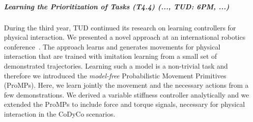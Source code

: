 

\subparagraph{Learning the Prioritization of Tasks (T4.4) (..., TUD: 6PM, ...)}%

During the third year, TUD continued its research on learning controllers for 
physical interaction. We presented a novel approach at an international robotics 
conference~\cite{paraschos2015model}. The approach learns and generates 
movements for physical interaction that are trained with imitation learning from 
a small set of demonstrated trajectories. Learning such a model is a non-trivial 
task and therefore we introduced the \textit{model-free} Probabilistic Movement 
Primitives (ProMPs). Here, we learn jointly the movement and the necessary 
actions from a few demonstrations. We derived a variable stiffness controller 
analytically and we extended the ProMPs to include force and torque signals, 
necessary for physical interaction in the CoDyCo scenarios. 

